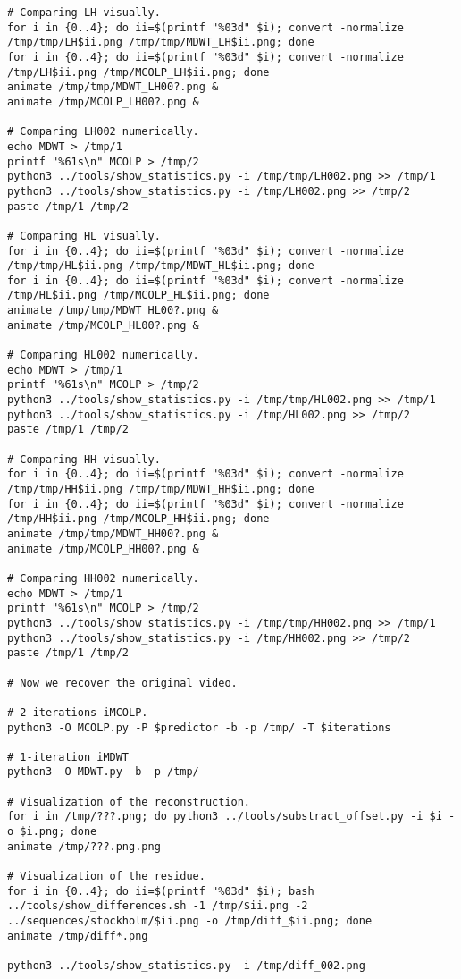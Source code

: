 \begin{verbatim}
# Comparing LH visually.
for i in {0..4}; do ii=$(printf "%03d" $i); convert -normalize /tmp/tmp/LH$ii.png /tmp/tmp/MDWT_LH$ii.png; done
for i in {0..4}; do ii=$(printf "%03d" $i); convert -normalize /tmp/LH$ii.png /tmp/MCOLP_LH$ii.png; done
animate /tmp/tmp/MDWT_LH00?.png &
animate /tmp/MCOLP_LH00?.png &

# Comparing LH002 numerically.
echo MDWT > /tmp/1
printf "%61s\n" MCOLP > /tmp/2
python3 ../tools/show_statistics.py -i /tmp/tmp/LH002.png >> /tmp/1
python3 ../tools/show_statistics.py -i /tmp/LH002.png >> /tmp/2
paste /tmp/1 /tmp/2

# Comparing HL visually.
for i in {0..4}; do ii=$(printf "%03d" $i); convert -normalize /tmp/tmp/HL$ii.png /tmp/tmp/MDWT_HL$ii.png; done
for i in {0..4}; do ii=$(printf "%03d" $i); convert -normalize /tmp/HL$ii.png /tmp/MCOLP_HL$ii.png; done
animate /tmp/tmp/MDWT_HL00?.png &
animate /tmp/MCOLP_HL00?.png &

# Comparing HL002 numerically.
echo MDWT > /tmp/1
printf "%61s\n" MCOLP > /tmp/2
python3 ../tools/show_statistics.py -i /tmp/tmp/HL002.png >> /tmp/1
python3 ../tools/show_statistics.py -i /tmp/HL002.png >> /tmp/2
paste /tmp/1 /tmp/2

# Comparing HH visually.
for i in {0..4}; do ii=$(printf "%03d" $i); convert -normalize /tmp/tmp/HH$ii.png /tmp/tmp/MDWT_HH$ii.png; done
for i in {0..4}; do ii=$(printf "%03d" $i); convert -normalize /tmp/HH$ii.png /tmp/MCOLP_HH$ii.png; done
animate /tmp/tmp/MDWT_HH00?.png &
animate /tmp/MCOLP_HH00?.png &

# Comparing HH002 numerically.
echo MDWT > /tmp/1
printf "%61s\n" MCOLP > /tmp/2
python3 ../tools/show_statistics.py -i /tmp/tmp/HH002.png >> /tmp/1
python3 ../tools/show_statistics.py -i /tmp/HH002.png >> /tmp/2
paste /tmp/1 /tmp/2

# Now we recover the original video.

# 2-iterations iMCOLP.
python3 -O MCOLP.py -P $predictor -b -p /tmp/ -T $iterations

# 1-iteration iMDWT
python3 -O MDWT.py -b -p /tmp/

# Visualization of the reconstruction.
for i in /tmp/???.png; do python3 ../tools/substract_offset.py -i $i -o $i.png; done
animate /tmp/???.png.png

# Visualization of the residue.
for i in {0..4}; do ii=$(printf "%03d" $i); bash ../tools/show_differences.sh -1 /tmp/$ii.png -2 ../sequences/stockholm/$ii.png -o /tmp/diff_$ii.png; done
animate /tmp/diff*.png

python3 ../tools/show_statistics.py -i /tmp/diff_002.png
\end{verbatim}

